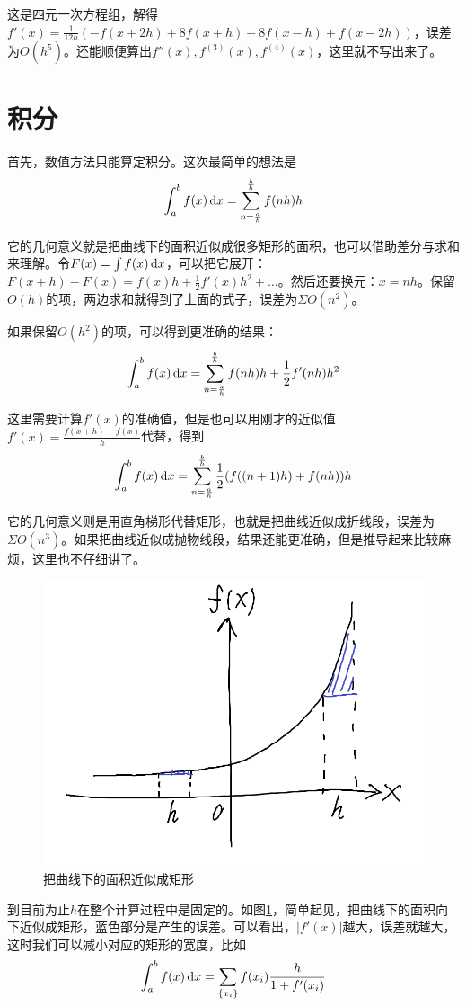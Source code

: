 这是四元一次方程组，解得$f'(x)=\frac{1}{12 h}(-f(x+2 h)+8 f(x+h)-8 f(x-h)+f(x-2 h))$，误差为$O(h^5)$。还能顺便算出$f''(x),f^{(3)}(x),f^{(4)}(x)$，这里就不写出来了。
\section{积分}
首先，数值方法只能算定积分。这次最简单的想法是
\begin{equation*}
\int_a^b f(x) \mathop{}\!\mathrm{d} x=\sum_{n=\frac{a}{h}}^{\frac{b}{h}} f(n h) h
\end{equation*}

它的几何意义就是把曲线下的面积近似成很多矩形的面积，也可以借助差分与求和来理解。令$F(x)=\int f(x) \mathop{}\!\mathrm{d} x$，可以把它展开：$F(x+h)-F(x)=f(x) h+\frac{1}{2} f'(x) h^2+\dots$。然后还要换元：$x=n h$。保留$O(h)$的项，两边求和就得到了上面的式子，误差为$\Sigma O(n^2)$。

如果保留$O(h^2)$的项，可以得到更准确的结果：
\begin{equation*}
\int_a^b f(x) \mathop{}\!\mathrm{d} x=\sum_{n=\frac{a}{h}}^{\frac{b}{h}} f(n h) h+\frac{1}{2} f'(n h) h^2
\end{equation*}

这里需要计算$f'(x)$的准确值，但是也可以用刚才的近似值$f'(x)=\frac{f(x+h)-f(x)}{h}$代替，得到
\begin{equation*}
\int_a^b f(x) \mathop{}\!\mathrm{d} x=\sum_{n=\frac{a}{h}}^{\frac{b}{h}} \frac{1}{2} (f((n+1) h)+f(n h)) h
\end{equation*}

它的几何意义则是用直角梯形代替矩形，也就是把曲线近似成折线段，误差为$\Sigma O(n^3)$。如果把曲线近似成抛物线段，结果还能更准确，但是推导起来比较麻烦，这里也不仔细讲了。
\begin{figure}[htb]
\centering
\includegraphics[width=0.33\linewidth]{fig/adjust-h.png}
\caption{把曲线下的面积近似成矩形}
\label{fig-adjust-h}
\end{figure}

到目前为止$h$在整个计算过程中是固定的。如图\ref{fig-adjust-h}，简单起见，把曲线下的面积向下近似成矩形，蓝色部分是产生的误差。可以看出，$|f'(x)|$越大，误差就越大，这时我们可以减小对应的矩形的宽度，比如
\begin{equation*}
\int_a^b f(x) \mathop{}\!\mathrm{d} x=\sum_{\{x_i\}} f(x_i) \frac{h}{1+f'(x_i)}
\end{equation*}

